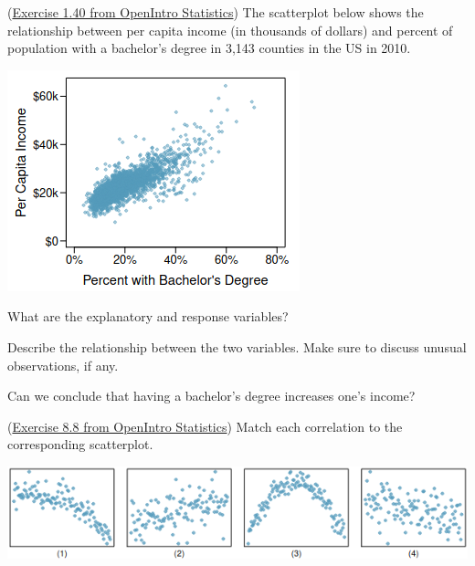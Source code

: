 \documentclass[12pt]{exam}
\newcounter{countA}
\begin{document}
\begin{questions}
\setcounter{question}{\value{countA}}

\question (\href{http://people.hsc.edu/faculty-staff/blins/books/OpenIntroStats4e.pdf\#eoce.1.40}{Exercise 1.40 from OpenIntro Statistics}) The scatterplot below shows the relationship between per capita income (in thousands of dollars) and percent of population with a bachelor's degree in 3{,}143 counties in the US in 2010.

\begin{center}
\includegraphics[scale=0.6]{percapitaIncome.png}
\end{center}

\begin{parts}
\item What are the explanatory and response variables?
\begin{solution}
\end{solution}
\bigskip

\item Describe the relationship between the two variables. Make sure to discuss unusual observations, if any.
\begin{solution}
\end{solution}
\bigskip

\item Can we conclude that having a bachelor's degree increases one’s income?
\begin{solution}
\end{solution}
\bigskip

\end{parts}

\question (\href{http://people.hsc.edu/faculty-staff/blins/books/OpenIntroStats4e.pdf\#eoce.8.8}{Exercise 8.8 from OpenIntro Statistics}) Match each correlation to the corresponding scatterplot.
\begin{center}
\includegraphics[scale=0.6]{correlations.png}
\end{center}


\end{questions}
\end{document}
